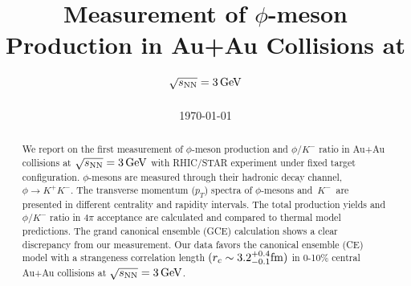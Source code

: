 \documentclass[%
 reprint,	
showpacs,
 amsmath,amssymb,
 aps,
 prc,
]{revtex4-1}
\begin{document}

\title{Measurement of $\phi$-meson Production in Au+Au Collisions at ${\sqrt{s_{\rm NN}} = \rm{3\,GeV}}$}%


\noaffiliation

\date{\today}%

\begin{abstract}


We report on the first measurement of $\phi$-meson production and $\phi/K^-$ ratio in Au+Au collisions at ${\sqrt{s_{\rm NN}} = \rm{3\,GeV}}$ with RHIC/STAR experiment under fixed target configuration. $\phi$-mesons are measured through their hadronic decay channel, $\phi\rightarrow K^+K^-$. The transverse momentum ($p_T$) spectra of $\phi$-mesons and $K^-$ are presented in different centrality and rapidity intervals. The total production yields and $\phi/K^-$ ratio in $4\pi$ acceptance are calculated and compared to thermal model predictions. The grand canonical ensemble (GCE) calculation shows a clear discrepancy from our measurement. Our data favors the canonical ensemble (CE) model with a strangeness correlation length $(r_c   \sim 3.2_{-0.1}^{+0.4} \rm{fm})$ in 0-10\% central Au+Au collisions at ${\sqrt{s_{\rm NN}} = \rm{3\,GeV}}$.


\end{abstract}
\end{document}
